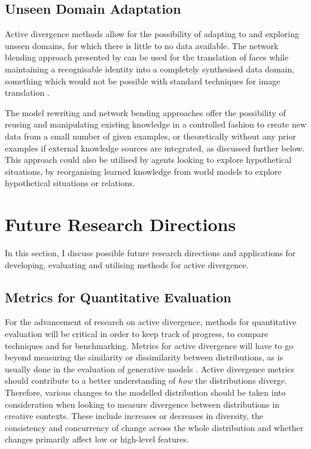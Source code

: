 \subsection{Unseen Domain Adaptation}

Active divergence methods allow for the possibility of adapting to and exploring unseen domains, for which there is little to no data available. 
The network blending approach presented by \citet{pinkney2020interpolation} can be used for the translation of faces while maintaining a recognisable identity into a completely synthesised data domain, something which would not be possible with standard techniques for image translation \citep{zhu2017unpaired}.

The model rewriting and network bending approaches offer the possibility of reusing and manipulating existing knowledge in a controlled fashion to create new data from a small number of given examples, or theoretically without any prior examples if external knowledge sources are integrated, as discussed further below. 
This approach could also be utilised by agents looking to explore hypothetical situations, by reorganising learned knowledge from world models \citep{ha2018worldmodels} to explore hypothetical situations or relations. 

\section{Future Research Directions}
\label{c6:sec:future}

In this section, I discuss possible future research directions and applications for developing, evaluating and utilising methods for active divergence.

\subsection{Metrics for Quantitative Evaluation}

For the advancement of research on active divergence, methods for quantitative evaluation will be critical in order to keep track of progress, to compare techniques and for benchmarking. 
Metrics for active divergence will have to go beyond measuring the similarity or dissimilarity between distributions, as is usually done in the evaluation of generative models \citep{gretton2019interpretable}. 
Active divergence metrics should contribute to a better understanding of \textit{how} the distributions diverge. 
Therefore, various changes to the modelled distribution should be taken into consideration when looking to measure divergence between distributions in creative contexts. These include increases or decreases in diversity, the consistency and concurrency of change across the whole distribution and whether changes primarily affect low or high-level features.

